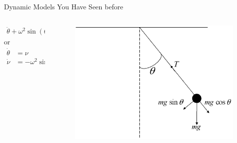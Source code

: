 \documentclass[aspectratio=169,10pt]{beamer}
\begin{document}
\begin{frame}{Dynamic Models You Have Seen before}
	\begin{columns}
		\begin{column}{0.4\textwidth}
			\begin{align*}
				\ddot{\theta}+ \omega^2 \sin(\theta) = 0
			\end{align*}
			\quad or 
			\begin{align*}
				\dot{\theta} &= \nu\\
				\dot{\nu} &= -\omega^2 \sin(\theta)
			\end{align*}
		\end{column}
		\begin{column}{0.6\textwidth}
			\begin{figure}[t!]
				\centering
				\includegraphics[width=\textwidth]{figs/pend}
				\vspace{-7mm}
			\end{figure}
		\end{column}
	\end{columns}
\end{frame}
\end{document}
